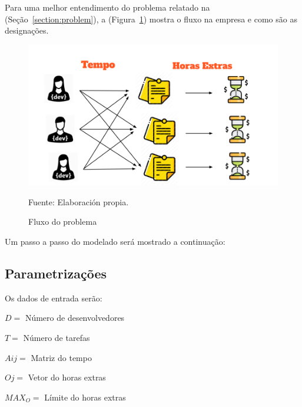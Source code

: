 \documentclass[12pt]{article}
\begin{document}
Para uma melhor entendimento do problema relatado na (Seção~\ref{section:problem}), a (Figura~\ref{figure:workflow}) mostra o fluxo na empresa e como são as designações.

\begin{figure}[!ht]
	\begin{center}
		\includegraphics[width=1\textwidth]{images/workflow}
	\end{center}
	\begin{center}
		\vskip -0.5cm
		\caption{\label{figure:workflow}
			\small{Fluxo do problema}}
		{\small{Fuente: Elaboración propia.}}
	\end{center}
\end{figure}

Um passo a passo do modelado será mostrado a continuação:

\subsection{Parametrizações}

Os dados de entrada serão:

\begin{center}
	$D = $ Número de desenvolvedores
\end{center}
\begin{center}
	$T = $ Número de tarefas
\end{center}
\begin{center}
	$Aij = $ Matriz do tempo
\end{center}
\begin{center}
	$Oj = $ Vetor do horas extras
\end{center}
\begin{center}
	$MAX_O = $ Límite do horas extras
\end{center}
\end{document}
